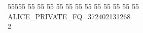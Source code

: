 %
%
\begin{tabbing}
55555 \= 55 \= 55 \= 55 \= 55 \= 55 \= 55 \= 55 \= 55 \= 55 \= 55 \= 55 \= 55 \= \>ALICE\_PRIVATE\_FQ=372402131268\\[0pt]
2\>\end{tabbing}
